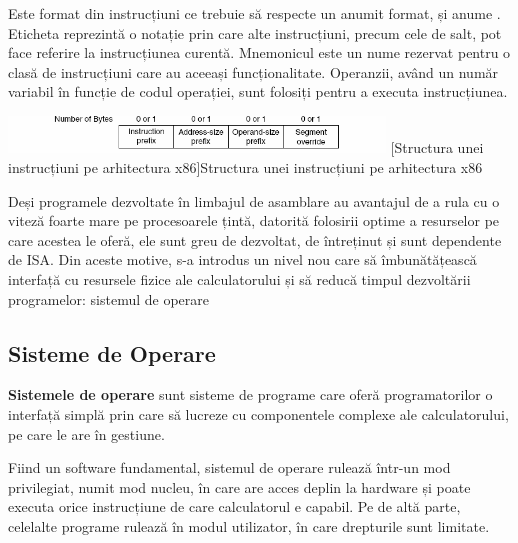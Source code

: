 \documentclass[../../main.tex]{subfiles}
\begin{document}
Este format din instrucțiuni ce trebuie să respecte un anumit format, și anume . Eticheta reprezintă o notație prin care alte instrucțiuni, precum cele de salt, pot face referire la instrucțiunea curentă. Mnemonicul este un nume rezervat pentru o clasă de instrucțiuni care au aceeași funcționalitate. Operanzii, având un număr variabil în funcție de codul operației, sunt folosiți pentru a executa instrucțiunea.

\vspace{0.3cm}
\begin{center}
    \includegraphics[width=10cm]{components/images/illustrations/x86_instruction_format.png}
    \label{fig:x86_instruction_format}
    \captionsetup{justification=centering,margin=1cm}
    [Structura unei instrucțiuni pe arhitectura x86]{Structura unei instrucțiuni pe arhitectura x86\footnotemark}
\end{center}


Deși programele dezvoltate în limbajul de asamblare au avantajul de a rula cu o viteză foarte mare pe procesoarele țintă, datorită folosirii optime a resurselor pe care acestea le oferă, ele sunt greu de dezvoltat, de întreținut și sunt dependente de ISA. Din aceste motive, s-a introdus un nivel nou care să îmbunătățească interfață cu resursele fizice ale calculatorului și să reducă timpul dezvoltării programelor: sistemul de operare

\subsection{Sisteme de Operare}

\textbf{Sistemele de operare} sunt sisteme de programe care oferă programatorilor o interfață simplă prin care să lucreze cu componentele complexe ale calculatorului, pe care le are în gestiune.

Fiind un software fundamental, sistemul de operare rulează într-un mod privilegiat, numit mod nucleu, în care are acces deplin la hardware și poate executa orice instrucțiune de care calculatorul e capabil. Pe de altă parte, celelalte programe rulează în modul utilizator, în care drepturile sunt limitate.
\end{document}
